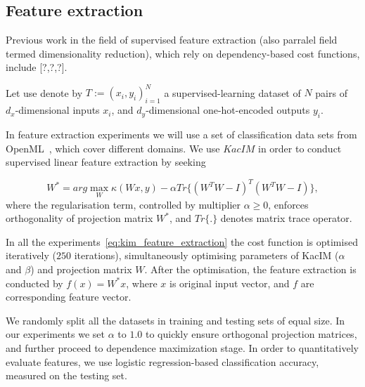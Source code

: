 \documentclass{article}
\begin{document}


\subsection{Feature extraction}

Previous work in the field of supervised feature extraction (also parralel field termed dimensionality reduction), which rely on dependency-based cost functions, include [?,?,?]. 




Let use denote by $T := (x_{i},y_{i})_{i=1}^{N}$ a supervised-learning dataset of $N$ pairs of $d_{x}$-dimensional inputs $x_{i}$, and $d_{y}$-dimensional one-hot-encoded outputs $y_{i}$.

In feature extraction experiments we will use a set of classification data sets from OpenML~\cite{OpenML2013}, which cover different domains.  We use $KacIM$ in order to conduct supervised linear feature extraction by seeking 

\begin{equation}
\label{eq:kim_feature_extraction}    
W^{*} = arg \max_{W} \kappa(Wx, y) - \alpha Tr\{(W^{T}W-I)^{T}(W^{T}W-I) \},
\end{equation}
where the regularisation term, controlled by multiplier $\alpha \geq 0$, enforces orthogonality of projection matrix $W^{*}$, and $Tr\{.\}$ denotes matrix trace operator.


In all the experiments~\eqref{eq:kim_feature_extraction} the cost function is optimised iteratively ($250$ iterations), simultaneously optimising parameters of KacIM ($\alpha$ and $\beta$) and projection matrix $W$.
After the optimisation, the feature extraction is conducted by $f(x) = W^{*}x$, where $x$ is original input vector, and $f$ are corresponding feature vector. 



We randomly split all the datasets in training and testing sets of equal size. %
In our experiments we set $\alpha$ to $1.0$ to quickly ensure orthogonal projection matrices, and further proceed to dependence maximization stage. In order to quantitatively evaluate features, we use logistic regression-based classification accuracy, measured on the testing set.
\end{document}
